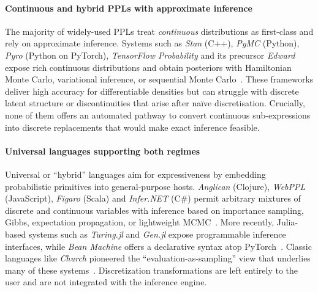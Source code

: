 \paragraph{Continuous and hybrid PPLs with approximate inference}  
The majority of widely-used PPLs treat \emph{continuous} distributions as first-class and rely on approximate inference. Systems such as \emph{Stan} (C++), \emph{PyMC} (Python), \emph{Pyro} (Python on PyTorch), \emph{TensorFlow Probability} and its precursor \emph{Edward} expose rich continuous distributions and obtain posteriors with Hamiltonian Monte Carlo, variational inference, or sequential Monte Carlo~\cite{Carpenter2017Stan,Salvatier2016PyMC3,Bingham2019Pyro,Dillon2017TFP,Tran2016Edward}. These frameworks deliver high accuracy for differentiable densities but can struggle with discrete latent structure or discontinuities that arise after naïve discretisation. Crucially, none of them offers an automated pathway to convert continuous sub-expressions into discrete replacements that would make exact inference feasible.

\paragraph{Universal languages supporting both regimes}  
Universal or ``hybrid'' languages aim for expressiveness by embedding probabilistic primitives into general-purpose hosts. \emph{Anglican} (Clojure), \emph{WebPPL} (JavaScript), \emph{Figaro} (Scala) and \emph{Infer.NET} (C\#) permit arbitrary mixtures of discrete and continuous variables with inference based on importance sampling, Gibbs, expectation propagation, or lightweight MCMC~\cite{Tolpin2016Anglican,Goodman2014WebPPL,Pfeffer2009Figaro,Minka2018InferNET}. More recently, Julia-based systems such as \emph{Turing.jl} and \emph{Gen.jl} expose programmable inference interfaces, while \emph{Bean Machine} offers a declarative syntax atop PyTorch~\cite{Ge2018Turing,CusumanoTowner2019Gen,Tehrani2020BeanMachine}. Classic languages like \emph{Church} pioneered the ``evaluation-as-sampling'' view that underlies many of these systems~\cite{Goodman2008Church}. Discretization transformations are left entirely to the user and are not integrated with the inference engine.

